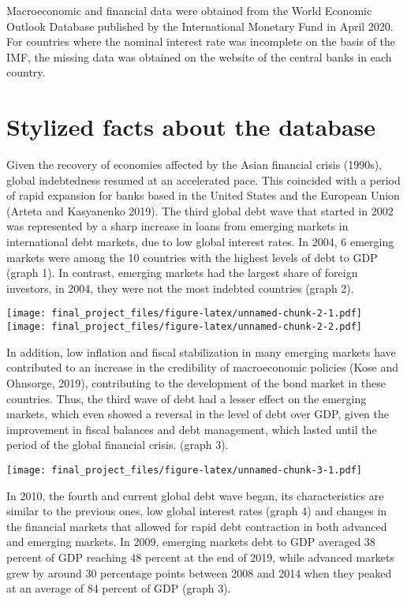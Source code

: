 \documentclass[
]{article}
\begin{document}
Macroeconomic and financial data were obtained from the World Economic
Outlook Database published by the International Monetary Fund in April
2020. For countries where the nominal interest rate was incomplete on
the basis of the IMF, the missing data was obtained on the website of
the central banks in each country.

\hypertarget{stylized-facts-about-the-database}{%
\section{Stylized facts about the
database}\label{stylized-facts-about-the-database}}

Given the recovery of economies affected by the Asian financial crisis
(1990s), global indebtedness resumed at an accelerated pace. This
coincided with a period of rapid expansion for banks based in the United
States and the European Union (Arteta and Kasyanenko 2019). The third
global debt wave that started in 2002 was represented by a sharp
increase in loans from emerging markets in international debt markets,
due to low global interest rates. In 2004, 6 emerging markets were among
the 10 countries with the highest levels of debt to GDP (graph 1). In
contrast, emerging markets had the largest share of foreign investors,
in 2004, they were not the most indebted countries (graph 2).

\texttt{[image: final\_project\_files/figure-latex/unnamed-chunk-2-1.pdf]}
\texttt{[image: final\_project\_files/figure-latex/unnamed-chunk-2-2.pdf]}

In addition, low inflation and fiscal stabilization in many emerging
markets have contributed to an increase in the credibility of
macroeconomic policies (Kose and Ohnsorge, 2019), contributing to the
development of the bond market in these countries. Thus, the third wave
of debt had a lesser effect on the emerging markets, which even showed a
reversal in the level of debt over GDP, given the improvement in fiscal
balances and debt management, which lasted until the period of the
global financial crisis. (graph 3).

\texttt{[image: final\_project\_files/figure-latex/unnamed-chunk-3-1.pdf]}

In 2010, the fourth and current global debt wave began, its
characteristics are similar to the previous ones, low global interest
rates (graph 4) and changes in the financial markets that allowed for
rapid debt contraction in both advanced and emerging markets. In 2009,
emerging markets debt to GDP averaged 38 percent of GDP reaching 48
percent at the end of 2019, while advanced markets grew by around 30
percentage points between 2008 and 2014 when they peaked at an average
of 84 percent of GDP (graph 3).
\end{document}

